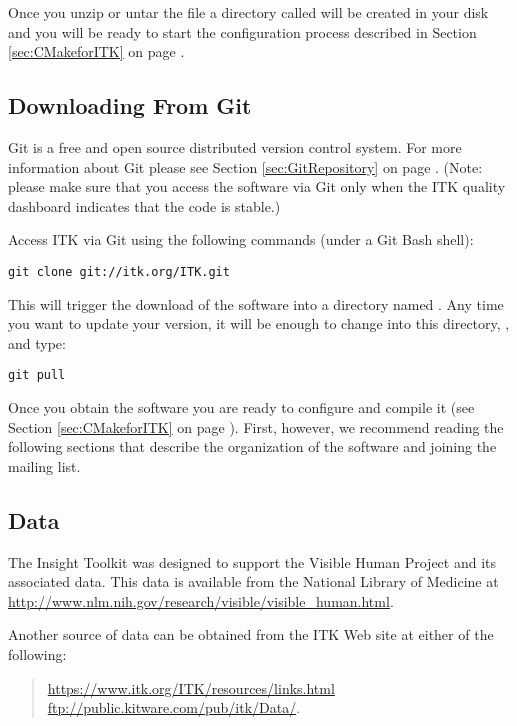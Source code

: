 Once you unzip or untar the file a directory called
 will be created in your disk and
you will be ready to start the configuration process described in Section
\ref{sec:CMakeforITK} on page \pageref{sec:CMakeforITK}.

\subsection{Downloading From Git}
\label{sec:DownloadingFromGit}


Git is a free and open source distributed version control system.  For more
information about Git please see Section \ref{sec:GitRepository} on page
\pageref{sec:GitRepository}. (Note: please make sure that you access the
software via Git only when the ITK quality dashboard indicates that the code
is stable.)

Access ITK via Git using the following commands (under a Git Bash shell):
\begin{verbatim}
git clone git://itk.org/ITK.git
\end{verbatim}

This will trigger the download of the software into a directory named
.  Any time you want to update your version, it will be enough to
change into this directory, , and type:
\begin{verbatim}
git pull
\end{verbatim}

Once you obtain the software you are ready to configure and compile it (see
Section \ref{sec:CMakeforITK} on page \pageref{sec:CMakeforITK}). First,
however, we recommend reading the following sections that describe the
organization of the software and joining the mailing list.

\subsection{Data}
\label{sec:Data}

The Insight Toolkit was designed to support the Visible Human Project
and its associated data. This data is available from the National Library of
Medicine at \url{http://www.nlm.nih.gov/research/visible/visible_human.html}.

Another source of data can be obtained from the ITK Web site at either
of the following:
\begin{quote}
\url{https://www.itk.org/ITK/resources/links.html} \\
\url{ftp://public.kitware.com/pub/itk/Data/}.
\end{quote}

